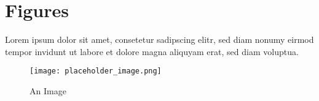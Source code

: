 \section{Figures}
\label{sec:figures}

	Lorem ipsum dolor sit amet, consetetur sadipscing elitr, sed diam nonumy eirmod tempor invidunt ut labore et dolore magna aliquyam erat, sed diam voluptua.
	
	\begin{figure}[H]
		\centering
		\texttt{[image: placeholder\_image.png]}
		\caption[An Image]{An Image}
		\label{fig:image_2}
	\end{figure}